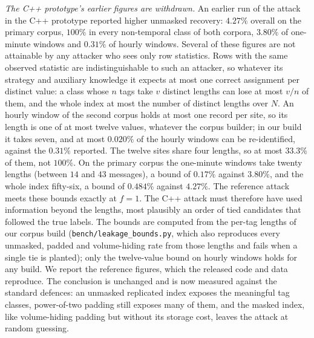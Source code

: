 \documentclass[11pt,a4paper]{article}
\newcommand{\authorcheck}[1]{}
\begin{document}
\emph{The C++ prototype's earlier figures are withdrawn.} An earlier run of the
attack in the C++ prototype reported higher unmasked recovery: $4.27\%$
overall on the primary corpus, $100\%$ in every non-temporal class of both
corpora, $3.80\%$ of one-minute windows and $0.31\%$ of hourly windows. Several
of these figures are not attainable by any attacker who sees only row
statistics. Rows with the same observed statistic are indistinguishable to such
an attacker, so whatever its strategy and auxiliary knowledge it expects at
most one correct assignment per distinct value: a class whose $n$ tags take
$v$ distinct lengths can lose at most $v/n$ of them, and the whole index at
most the number of distinct lengths over $N$. An hourly window of the second
corpus holds at most one record per site, so its length is one of at most
twelve values, whatever the corpus builder; in our build it takes seven, and at
most $0.020\%$ of the hourly windows can be re-identified, against the $0.31\%$
reported. The twelve sites share four lengths, so at most $33.3\%$ of them, not
$100\%$. On the primary corpus the one-minute windows take twenty lengths
(between $14$ and $43$ messages), a bound of $0.17\%$ against $3.80\%$, and the
whole index fifty-six, a bound of $0.484\%$ against $4.27\%$. The reference
attack meets these bounds exactly at $f=1$. The C++ attack must therefore have
used information beyond the lengths, most plausibly an order of tied
candidates that followed the true labels. The bounds are computed from the
per-tag lengths of our corpus build (\texttt{bench/leakage\_bounds.py}, which
also reproduces every unmasked, padded and volume-hiding rate from those
lengths and fails when a single tie is planted); only the twelve-value bound on
hourly windows holds for any build. We report the reference figures, which the
released code and data reproduce. The conclusion
is unchanged and is now measured against the standard defences: an unmasked
replicated index exposes the meaningful tag classes, power-of-two padding
still exposes many of them, and the masked index, like volume-hiding padding
but without its storage cost, leaves the attack at random guessing.
\authorcheck{If the C++ prototype is released, check its attack's
tie-breaking and compare its per-tag lengths with results/lengths\_*.csv.gz.}


\end{document}
